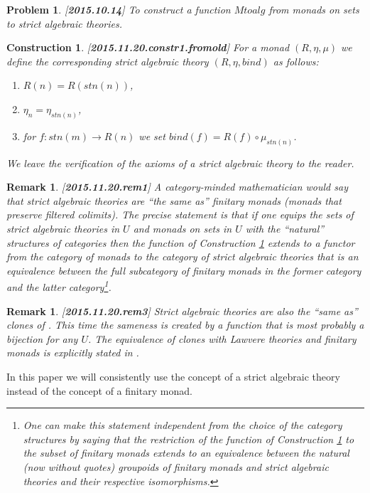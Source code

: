 \documentclass[11pt]{article}
\newtheorem{remark}[proposition]{Remark}
\newtheorem{problem}[proposition]{Problem}
\newtheorem{construction}[proposition]{Construction}
\newcommand{\llabel}[1]{\label{#1}[{\bf #1}]}
\newcommand{\sr}{\rightarrow}
\newcommand{\bind}{bind}
\begin{document}
%
\begin{problem}
\llabel{2015.10.14}
To construct a function $Mtoalg$ from monads on sets to strict algebraic theories.
\end{problem}
%
\begin{construction}\rm 
\llabel{2015.11.20.constr1.fromold}
For a monad $(R,\eta,\mu)$ we define the corresponding strict algebraic theory $(R,\eta,\bind)$ as follows:
%
\begin{enumerate}
\item $R(n)=R(stn(n))$,
\item $\eta_n=\eta_{stn(n)}$,
\item for $f:stn(m)\sr R(n)$ we set $\bind(f)=R(f)\circ \mu_{stn(n)}$.
\end{enumerate}
%
We leave the verification of the axioms of a strict algebraic theory to the reader.
\end{construction}
%
%
\begin{remark}\rm
\llabel{2015.11.20.rem1}
A category-minded mathematician would say that strict algebraic theories are ``the same as'' finitary monads (monads that preserve filtered colimits). The precise statement is that if one equips the sets of strict algebraic theories in $U$ and monads on sets in $U$ with the ``natural'' structures of categories then the function of Construction \ref{2015.11.20.constr1.fromold} extends to a functor from the  category of monads to the category of strict algebraic theories that is an equivalence between the full subcategory of finitary monads in the former category and the latter category\footnote{One can make this statement independent from the choice of the category structures by saying that the restriction of the function of Construction \ref{2015.11.20.constr1.fromold} to the subset of finitary monads extends to an equivalence between the natural (now without quotes) groupoids of finitary monads and strict algebraic theories and their respective isomorphisms. }. 
\end{remark}
%
\begin{remark}\rm
\llabel{2015.11.20.rem3}
Strict algebraic theories are also the ``same as'' clones of \cite[Section 3]{FPT}. This time the sameness is created by a function that is most probably a bijection for any $U$. The equivalence of clones with Lawvere theories and finitary monads is explicitly stated in \cite[Section 3]{FPT}. 
\end{remark}
%
In this paper we will consistently use the concept of a strict algebraic theory instead of the concept of a finitary monad. 
\end{document}
